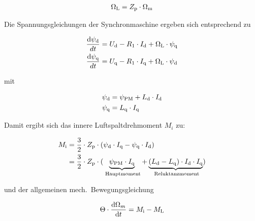 \begin{align}
\Omega_{\mathrm{L}} = Z_{\mathrm{p}}\cdot\Omega_{\mathrm{m}}
\end{align}

Die Spannungsgleichungen der Synchronmaschine ergeben sich entsprechend zu

\begin{align}
\frac{\mathrm{d}\psi_{\mathrm{d}}}{dt} &= U_{\mathrm{d}} - R_{\mathrm{1}}\cdot I_{\mathrm{d}} + \Omega_{\mathrm{L}}\cdot\psi_{\mathrm{q}} \\
\frac{\mathrm{d}\psi_{\mathrm{q}}}{dt} &= U_{\mathrm{q}} - R_{\mathrm{1}}\cdot I_{\mathrm{q}} + \Omega_{\mathrm{L}}\cdot\psi_{\mathrm{d}} \\
\end{align}

mit 

\begin{align}
\psi_{\mathrm{d}} &= \psi_{\mathrm{PM}} + L_{\mathrm{d}}\cdot I_{\mathrm{d}}\\
\psi_{\mathrm{q}} &= L_{\mathrm{q}}\cdot I_{\mathrm{q}}
\end{align}

Damit ergibt sich das innere Luftspaltdrehmoment $M_i$ zu:

\begin{align}
M_{\mathrm{i}} &= \frac{3}{2}\cdot Z_{\mathrm{p}} \cdot (\psi_{\mathrm{d}}\cdot I_{\mathrm{q}} - \psi_{\mathrm{q}}\cdot I_{\mathrm{d}}) \\ 
\nonumber &= \frac{3}{2}\cdot Z_{\mathrm{p}} \cdot (\underbrace{\psi_{\mathrm{PM}}\cdot I_{\mathrm{q}}}_{\mathrm{\text{~Hauptmoment}}} + \underbrace{(L_{\mathrm{d}}-L_{\mathrm{q}})\cdot I_{\mathrm{d}}\cdot I_{\mathrm{q}}}_{\mathrm{\text{~Reluktanzmoment}}})
\end{align}

und der allgemeinen mech.\ Bewegungsgleichung

\begin{align}
\Theta\cdot \frac{\mathrm{d}\Omega_m}{\mathrm{d}t} = M_{\mathrm{i}} - M_{\mathrm{L}}
\end{align}









